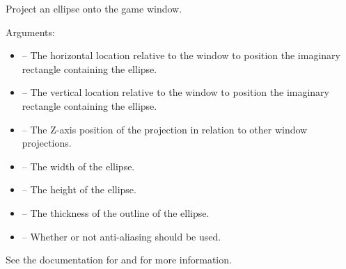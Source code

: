 \documentclass[letterpaper,10pt,english]{sphinxmanual}
\begin{document}
\begin{fulllineitems}
\label{dsp:sge.dsp.Game.project_ellipse}
Project an ellipse onto the game window.

Arguments:
\begin{itemize}
\item {} 
 -- The horizontal location relative to the window to
position the imaginary rectangle containing the ellipse.

\item {} 
 -- The vertical location relative to the window to
position the imaginary rectangle containing the ellipse.

\item {} 
 -- The Z-axis position of the projection in relation to
other window projections.

\item {} 
 -- The width of the ellipse.

\item {} 
 -- The height of the ellipse.

\item {} 
 -- The thickness of the outline of the
ellipse.

\item {} 
 -- Whether or not anti-aliasing should be used.

\end{itemize}

See the documentation for {\hyperref[gfx:sge.gfx.Sprite.draw_ellipse]{\emph{}}}
and {\hyperref[dsp:sge.dsp.Game.project_dot]{\emph{}}} for more information.

\end{fulllineitems}

\end{document}
